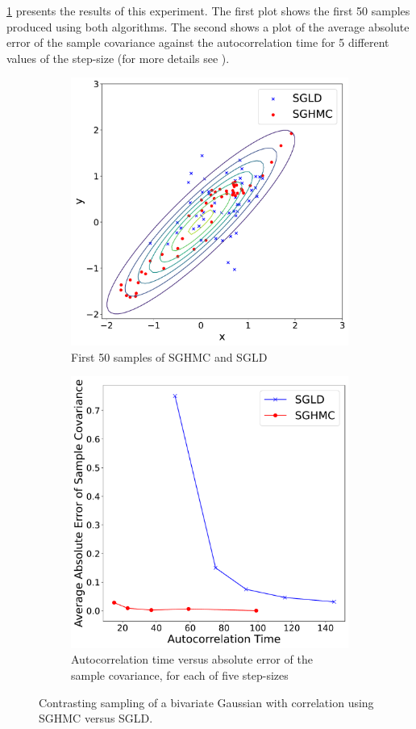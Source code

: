 \cref{fig:sghmc vs sgld} presents the results of this experiment. The first plot shows the first 50 samples produced using both algorithms. The second shows a plot of the average absolute error of the sample covariance against the autocorrelation time for 5 different values of the step-size (for more details see \cite{sghmc}).
\begin{figure}[h!]
  \begin{subfigure}{.5\textwidth}
  \includegraphics[width=.95\linewidth]{parts/Images/fig3b.pdf}
  \caption{First 50 samples of SGHMC and SGLD}
  \end{subfigure}
  \begin{subfigure}{.5\textwidth}
  \includegraphics[width=.95\linewidth]{parts/Images/fig3a.pdf}
  \caption{Autocorrelation time versus absolute error of the sample covariance, for each of five step-sizes}
  \end{subfigure}%
  \caption{Contrasting sampling of a bivariate Gaussian with correlation using SGHMC versus SGLD.}
  \label{fig:sghmc vs sgld}
\end{figure}
